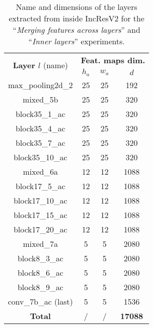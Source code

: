 \begin{table}
\centering
\begin{tabular}{|c|ccc|}
\hline
\multirow{2}{*}{\textbf{Layer $l$} (name)} & \multicolumn{3}{c|}{\textbf{Feat. maps dim.}}\\
& $h_a$ & $w_a$ & $d$ \\
\hline
max\_pooling2d\_2 & 25 & 25 & 192 \\
mixed\_5b & 25 & 25 & 320 \\
block35\_1\_ac & 25 & 25 & 320 \\
block35\_4\_ac & 25 & 25 & 320 \\
block35\_7\_ac & 25 & 25 & 320 \\
block35\_10\_ac & 25 & 25 & 320 \\
mixed\_6a & 12 & 12 & 1088 \\
block17\_5\_ac & 12 & 12 & 1088 \\
block17\_10\_ac & 12 & 12 & 1088 \\
block17\_15\_ac & 12 & 12 & 1088 \\
block17\_20\_ac & 12 & 12 & 1088 \\
mixed\_7a & 5 & 5 & 2080 \\
block8\_3\_ac & 5 & 5 & 2080 \\
block8\_6\_ac & 5 & 5 & 2080 \\
block8\_9\_ac & 5 & 5 & 2080 \\
conv\_7b\_ac (last) & 5 & 5 & 1536 \\
\hline
\textbf{Total} & / & / & \textbf{17088} \\
\hline 
\end{tabular}
\caption{Name and dimensions of the layers extracted from inside IncResV2 for the ``\textit{Merging features across layers}'' and ``\textit{Inner layers}'' experiments.}
\label{app:comp:tab:inner_layers_incresv2}
\end{table}


